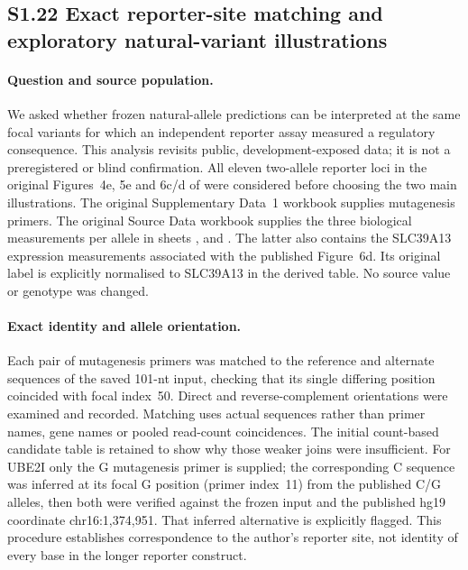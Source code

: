 \subsection*{S1.22 Exact reporter-site matching and exploratory natural-variant illustrations}

\paragraph{Question and source population.} We asked whether frozen natural-allele predictions can be interpreted at the same focal variants for which an independent reporter assay measured a regulatory consequence. This analysis revisits public, development-exposed data; it is not a preregistered or blind confirmation. All eleven two-allele reporter loci in the original Figures~4e, 5e and 6c/d of \citet{yang2019asb} were considered before choosing the two main illustrations. The original Supplementary Data~1 workbook  supplies mutagenesis primers. The original Source Data workbook  supplies the three biological measurements per allele in sheets ,  and . The latter also contains the SLC39A13 expression measurements associated with the published Figure~6d. Its original label  is explicitly normalised to SLC39A13 in the derived table. No source value or genotype was changed.

\paragraph{Exact identity and allele orientation.} Each pair of mutagenesis primers was matched to the reference and alternate sequences of the saved 101-nt input, checking that its single differing position coincided with focal index~50. Direct and reverse-complement orientations were examined and recorded. Matching uses actual sequences rather than primer names, gene names or pooled read-count coincidences. The initial count-based candidate table is retained to show why those weaker joins were insufficient. For UBE2I only the G mutagenesis primer is supplied; the corresponding C sequence was inferred at its focal G position (primer index~11) from the published C/G alleles, then both were verified against the frozen input and the published hg19 coordinate chr16:1,374,951. That inferred alternative is explicitly flagged. This procedure establishes correspondence to the author's reporter site, not identity of every base in the longer reporter construct.

